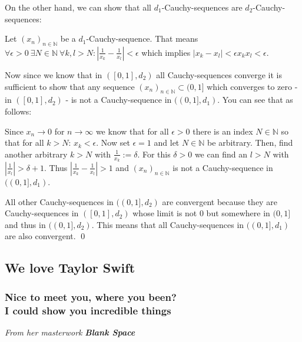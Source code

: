\documentclass[a4paper]{article}
\renewcommand{\hline}{\noindent\makebox[\linewidth]{\rule{12cm}{1pt}}}
\newcommand{\vip}[1]{\textit{\textbf{#1}}}
\begin{document}
On the other hand, we can show that all $d_1$-Cauchy-sequences are $d_2$-Cauchy-sequences:

Let $(x_n)_{n\in\mathbb N}$ be a $d_1$-Cauchy-sequence. That means $\forall \epsilon\! >\! 0\ \exists N\!\in\!\mathbb N \ \forall k,l>N: |\frac{1}{x_k}-\frac{1}{x_l}|<\epsilon$ which implies $|x_k-x_l|<\epsilon x_kx_l < \epsilon$.

Now since we know that in $([0,1],d_2)$ all Cauchy-sequences converge it is sufficient to show that any sequence $(x_n)_{n\in\mathbb N}\subset (0,1]$  which converges to zero - in $([0,1],d_2)$ - is not a Cauchy-sequence in $((0,1],d_1)$. You can see that as follows: 

Since $x_n \longrightarrow 0$ for $n\to\infty$ we know that for all $\epsilon > 0$ there is an index $N\in \mathbb N$ so that for all $k>N$: $x_k<\epsilon$. Now set $\epsilon = 1$ and let $N\in\mathbb N$ be arbitrary. Then, find another arbitrary $k>N$ with $\frac{1}{x_k} := \delta$. For this $\delta > 0$ we can find an $l>N$ with $|\frac{1}{x_l}|>\delta+1$. Thus $|\frac{1}{x_k} - \frac{1}{x_l}|>1$ and $(x_n)_{n\in\mathbb N}$ is not a Cauchy-sequence in $((0,1],d_1)$.

All other Cauchy-sequences in $((0,1],d_2)$ are convergent because they are Cauchy-sequences in $([0,1],d_2)$ whose limit is not 0 but somewhere in $(0,1]$ and thus in $((0,1],d_2)$. This means that all Cauchy-sequences in $((0,1],d_1)$ are also convergent. \qed

\hline

\subsection*{We love Taylor Swift}
\subsubsection*{Nice to meet you, where you been?\\
I could show you incredible things}
{\color{grey}\emph{From her masterwork }\vip{Blank Space}}

\hline 
\end{document}
